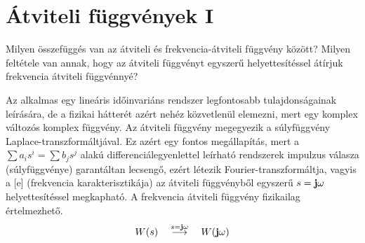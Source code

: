 \documentclass[../main.tex]{subfiles}
\begin{document}
\section{Átviteli függvények I}

\begin{fulltheorem}
  Milyen összefüggés van az átviteli és frekvencia-átviteli függvény között?
  Milyen feltétele van annak, hogy az átviteli függvényt egyszerű
  helyettesítéssel átírjuk frekvencia átviteli függvénnyé?
\end{fulltheorem}

Az  alkalmas egy lineáris időinvariáns rendszer legfontosabb
tulajdonságainak leírására, de a fizikai hátterét azért nehéz közvetlenül
elemezni, mert egy komplex változós komplex függvény. Az átviteli függvény
megegyezik a súlyfüggvény Laplace-transzformáltjával. Ez azért egy fontos
megállapítás, mert a $\sum a_i s^i = \sum b_j s^j$ alakú differenciálegyenlettel
leírható rendszerek impulzus válasza (súlyfüggvénye) garantáltan lecsengő,
ezért létezik Fourier-transzformáltja, vagyis a [e]
(frekvencia karakterisztikája) az átviteli függvényből egyszerű $s = \mathbf{j} \omega$
helyettesítéssel megkapható. A frekvencia átviteli függvény fizikailag
értelmezhető.
\[
  W(s) \quad \overset{s = \mathbf{j} \omega}{\longrightarrow} \quad W(\mathbf{j} \omega)
\]
\end{document}
